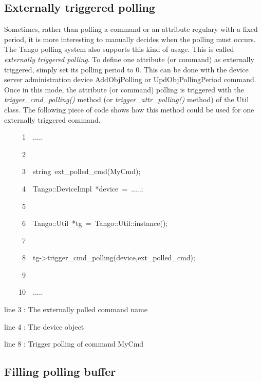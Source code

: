 \subsection{Externally triggered polling}

Sometimes, rather than polling a command or an attribute regulary
with a fixed period, it is more interesting to \textquotedbl{}manually\textquotedbl{}
decides when the polling must occurs. The Tango polling system also
supports this kind of usage. This is called \emph{externally triggered
polling}. To define one attribute (or command) as externally triggered,
simply set its polling period to 0. This can be done with the device
server administration device AddObjPolling or UpdObjPollingPeriod
command. Once in this mode, the attribute (or command) polling is
triggered with the \emph{trigger\_cmd\_polling()} method (or \emph{trigger\_attr\_polling()}
method) of the Util class. The following piece of code shows how this
method could be used for one externally triggered command.


\begin{lyxcode}
~~~~~1~~.....

~~~~~2~~

~~~~~3~~string~ext\_polled\_cmd(\textquotedbl{}MyCmd\textquotedbl{});

~~~~~4~~Tango::DeviceImpl~{*}device~=~.....;

~~~~~5~~

~~~~~6~~Tango::Util~{*}tg~=~Tango::Util::instance();

~~~~~7~~

~~~~~8~~tg->trigger\_cmd\_polling(device,ext\_polled\_cmd);

~~~~~9~~

~~~~10~~.....


\end{lyxcode}


line 3 : The externally polled command name

line 4 : The device object

line 8 : Trigger polling of command MyCmd


\subsection{Filling polling buffer}

